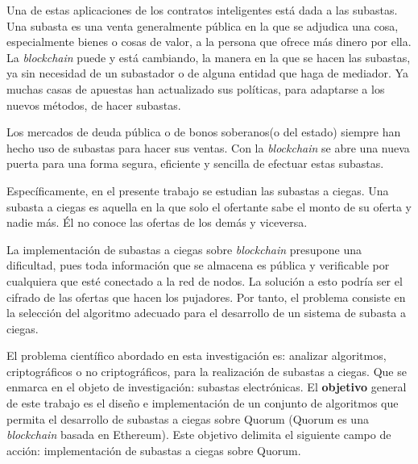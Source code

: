   Una de estas aplicaciones de los contratos inteligentes está dada a las subastas. Una subasta es una venta generalmente pública en la 
  que se adjudica una cosa, especialmente bienes o cosas de valor, a la persona que ofrece más dinero por ella. La \textit{blockchain} puede y 
  está cambiando, la manera en la que se hacen las subastas, ya sin necesidad de un subastador o de alguna entidad que haga de mediador. 
  Ya muchas casas de apuestas han actualizado sus políticas, para adaptarse a los nuevos métodos, de hacer subastas. 

  Los mercados de deuda pública o de bonos soberanos(o del estado) siempre han hecho uso de subastas para hacer sus ventas. Con la
  \textit{blockchain} se abre una nueva puerta para una forma segura, eficiente y sencilla de efectuar estas subastas. 

  Específicamente, en el presente trabajo se estudian las subastas a ciegas. Una subasta a ciegas es aquella en la que solo el ofertante 
  sabe el monto de su oferta y nadie más. Él no conoce las ofertas de los demás y viceversa.

  La implementación de subastas a ciegas sobre \textit{blockchain} presupone una dificultad, pues toda información que se almacena es pública y 
  verificable por cualquiera que esté conectado a la red de nodos. La solución a esto podría ser el cifrado de las ofertas que hacen 
  los pujadores. Por tanto, el problema consiste en la selección del algoritmo adecuado para el desarrollo de un sistema de 
  subasta a ciegas.

  El problema científico abordado en esta investigación es: analizar algoritmos, criptográficos o no criptográficos, para la 
  realización de subastas a ciegas. Que se enmarca en el objeto de investigación: subastas electrónicas. El \textbf{objetivo} general de 
  este trabajo es el diseño e implementación de un conjunto de algoritmos que permita el desarrollo de subastas a ciegas sobre Quorum 
  (Quorum es una \textit{blockchain} basada en Ethereum). Este objetivo delimita el siguiente campo de acción: implementación de subastas 
  a ciegas sobre Quorum.

